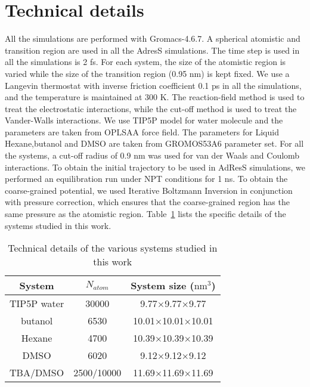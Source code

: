 \documentclass[a4paper,preprint,unsortedaddress]{revtex4-1}
\begin{document}
\section{Technical details}
\label{app:i}
All the simulations are performed with Gromacs-4.6.7. A spherical atomistic and transition region 
are used in all the AdresS simulations. The time step is used in all the simulations is 2 fs. 
For each system, the size of the atomistic region is varied while the size of the transition region (0.95 nm) is kept fixed. We use 
a Langevin thermostat with inverse friction coefficient 0.1 ps in all the simulations, and the 
temperature is maintained at 300 K. The reaction-field method 
is used to treat the electrostatic interactions, while the cut-off method is used to treat the 
Vander-Walls interactions. We use TIP5P model for water molecule and the parameters are taken from
OPLSAA force field. The parameters for Liquid Hexane,butanol and DMSO are taken from 
GROMOS53A6 parameter set. For all the systems, a cut-off radius of
0.9 nm was used for van der Waals and Coulomb interactions. To obtain the initial trajectory to be used 
in AdResS simulations, we performed an equilibration run under NPT conditions for 1 ns.   
To obtain the coarse-grained potential, we used Iterative Boltzmann Inversion in conjunction 
with pressure correction, which ensures that the coarse-grained region has the same 
pressure as the atomistic region. Table~\ref{tec} lists the specific 
details of the systems studied in this work. 
\begin{table}[]
\begin{center}
\begin{tabular}{ccc}
\hline \hline
 System & $N_{atom}$ & System size ($\textrm{nm}^{3}$)  \\
\hline
TIP5P water & 30000 & 9.77$\times$9.77$\times$9.77 \\
butanol & 6530 & 10.01$\times$10.01$\times$10.01 \\
Hexane & 4700 & 10.39$\times$10.39$\times$10.39 \\
DMSO & 6020 & 9.12$\times$9.12$\times$9.12 \\
TBA/DMSO & 2500/10000 & 11.69$\times$11.69$\times$11.69 \\
\hline \hline
\end{tabular}
\caption{Technical details of the various systems studied in this work}
\label{tec}
\end{center}
\end{table}
\end{document}
